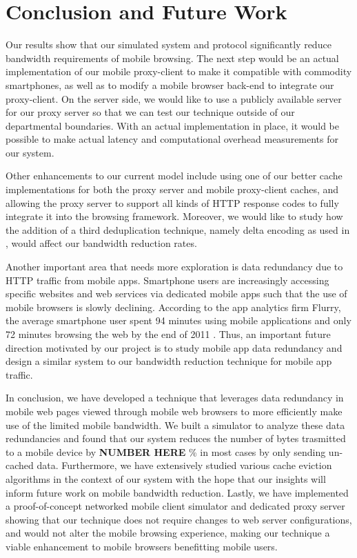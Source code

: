 \section{Conclusion and Future Work}
\label{sec:conclusion}
Our results show that our simulated system and protocol significantly reduce bandwidth requirements of mobile browsing. The next step would be an actual implementation of our mobile proxy-client to make it compatible with commodity smartphones, as well as to modify a mobile browser back-end to integrate our proxy-client. On the server side, we would like to use a publicly available server for our proxy server so that we can test our technique outside of our departmental boundaries. With an actual implementation in place, it would be possible to make actual latency and computational overhead measurements for our system.

Other enhancements to our current model include using one of our better cache implementations for both the proxy server and mobile proxy-client caches, and allowing the proxy server to support all kinds of HTTP response codes to fully integrate it into the browsing framework. Moreover, we would like to study how the addition of a third deduplication technique, namely delta encoding as used in \cite{shilane}, would affect our bandwidth reduction rates.

Another important area that needs more exploration is data redundancy due to HTTP traffic from mobile apps. Smartphone users are increasingly accessing specific websites and web services via dedicated mobile apps such that the use of mobile browsers is slowly declining. According to the app analytics firm Flurry, the average smartphone user spent 94 minutes using mobile applications and only 72 minutes browsing the web by the end of 2011 \cite{flurry}. Thus, an important future direction motivated by our project is to study mobile app data redundancy and design a similar system to our bandwidth reduction technique for mobile app traffic.

In conclusion, we have developed a technique that leverages data redundancy in mobile web pages viewed through mobile web browsers to more efficiently make use of the limited mobile bandwidth. We built a simulator to analyze these data redundancies and found that our system reduces the number of bytes trasmitted to a mobile device by \textbf{NUMBER HERE} \% in most cases by only sending un-cached data. 
Furthermore, we have extensively studied various cache eviction algorithms in the context of our system with the hope that our insights will inform future work on mobile bandwidth reduction.
Lastly, we have implemented a proof-of-concept networked mobile client simulator and dedicated proxy server showing that our technique does not require changes to web server configurations, and would not alter the mobile browsing experience, making our technique a viable enhancement to mobile browsers benefitting mobile users.



